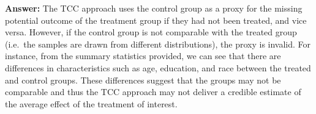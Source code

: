 \documentclass[
]{article}
\begin{document}
\begin{enumerate}
\begin{enumerate}
    \textbf{Answer:} The TCC approach uses the control group as a proxy
    for the missing potential outcome of the treatment group if they had
    not been treated, and vice versa. However, if the control group is
    not comparable with the treated group (i.e.~the samples are drawn
    from different distributions), the proxy is invalid. For instance,
    from the summary statistics provided, we can see that there are
    differences in characteristics such as age, education, and race
    between the treated and control groups. These differences suggest
    that the groups may not be comparable and thus the TCC approach may
    not deliver a credible estimate of the average effect of the
    treatment of interest.
  \end{enumerate}
\end{enumerate}

\pagebreak
\end{document}
